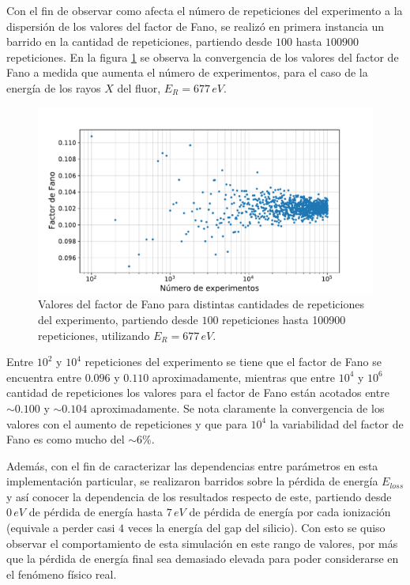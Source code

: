 Con el fin de observar como afecta el número de repeticiones del experimento a la dispersión de los valores del factor de Fano, se realizó en primera instancia un barrido en la cantidad de repeticiones, partiendo desde $100$ hasta $100900$ repeticiones. En la figura \ref{fig:FanoConvergencia} se observa la convergencia de los valores del factor de Fano a medida que aumenta el número de experimentos, para el caso de la energía de los rayos $X$ del fluor, $E_{R} = 677\,\si{eV}$.
\begin{figure}%
    \centering
    \includegraphics[scale=0.5]{Figs/FanoConvergencia.pdf}
    \caption{\footnotesize{Valores del factor de Fano para distintas cantidades de repeticiones del experimento, partiendo desde $100$ repeticiones hasta 100900 repeticiones, utilizando $E_{R} = 677\,\si{eV}$.}}
    \label{fig:FanoConvergencia}
\end{figure}
Entre $10^{2}$ y $10^{4}$ repeticiones del experimento se tiene que el factor de Fano se encuentra entre $0.096$ y $0.110$ aproximadamente, mientras que entre $10^{4}$ y $10^{6}$ cantidad de repeticiones los valores para el factor de Fano están acotados entre $\sim 0.100$ y $\sim 0.104$ aproximadamente. Se nota claramente la convergencia de los valores con el aumento de repeticiones y que para $10^{4}$ la variabilidad del factor de Fano es como mucho del $\sim 6\%$.


Además, con el fin de caracterizar las dependencias entre parámetros en esta implementación particular, se realizaron barridos sobre la pérdida de energía $E_{loss}$ y así conocer la dependencia de los resultados respecto de este, partiendo desde $0\,\si{eV}$ de pérdida de energía hasta $7\,\si{eV}$ de pérdida de energía por cada ionización (equivale a perder casi $4$ veces la energía del gap del silicio). Con esto se quiso observar el comportamiento de esta simulación en este rango de valores, por más que la pérdida de energía final sea demasiado elevada para poder considerarse en el fenómeno físico real. 

